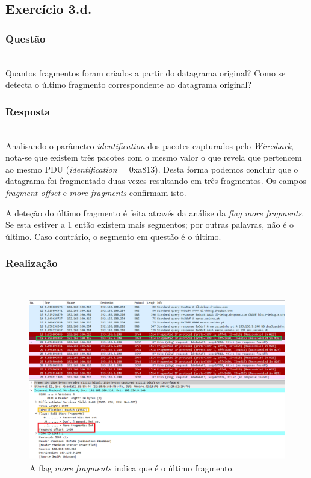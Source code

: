 \documentclass{llncs}
\begin{document}
\subsection{Exercício 3.d.}
\subsubsection{Questão}\rule[-10pt]{0pt}{10pt}\\

Quantos fragmentos foram criados a partir do datagrama original? Como se detecta o último fragmento correspondente ao datagrama original?

\subsubsection{Resposta}\rule[-10pt]{0pt}{10pt}\\

Analisando o parâmetro \textit{identification} dos pacotes capturados pelo \textit{Wireshark}, nota-se que existem três pacotes com o mesmo valor o que revela que pertencem ao mesmo PDU (\textit{identification} = 0xa813). Desta forma podemos concluir que o datagrama foi fragmentado duas vezes resultando em três fragmentos. Os campos \textit{fragment offset} e \textit{more fragments} confirmam isto.
	
A deteção do último fragmento é feita através da análise da \textit{flag more fragments}. Se esta estiver a 1 então existem mais segmentos; por outras palavras, não é o último. Caso contrário, o segmento em questão é o último.

\subsubsection{Realização}\rule[-10pt]{0pt}{10pt}\\

\begin{figure}
	\begin{center}
	\includegraphics[scale=0.35]{./imagens/packet_second.png} 
	\end{center}
	\caption{\label{fig:packet_third}A flag \textit{more fragments} indica que é o último fragmento.}
\end{figure} 
\end{document}
